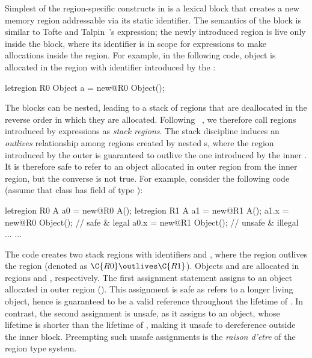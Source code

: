 Simplest of the region-specific constructs in \name is a 
lexical block that creates a new memory region addressable via its
static identifier. The semantics of the  block is similar
to Tofte and Talpin~\cite{ttpopl94}'s  expression; the
newly introduced region is live only inside the block, where its
identifier is in scope for  expressions to make allocations
inside the region. For example, in the following code, object  is
allocated in the region with identifier  introduced by the
:
\begin{center}
\begin{codejava}
  letregion R0 {
    Object a = new@R0 Object();
  }
\end{codejava}
\end{center}
The  blocks can be nested, leading to a stack of regions
that are deallocated in the reverse order in which they are allocated.
Following ~\cite{cyclonepldi02}, we therefore call regions introduced
by  expressions as \emph{stack regions}. The stack
discipline induces an \emph{outlives} relationship among regions created
by nested s, where the region introduced by the outer
 is guaranteed to outlive the one introduced by the inner
. It is therefore safe to refer to an object allocated in
outer region from the inner region, but the converse is not true. For
example, consider the following code (assume that class  has
field  of type ):
\begin{center}
\begin{codejava}
  letregion R0 {
    A a0 = new@R0 A();
    letregion R1 {
      A a1 = new@R1 A();
      a1.x = new@R0 Object(); // safe & legal
      a0.x = new@R1 Object(); // unsafe & illegal
      ...
    }
    ...
  }
\end{codejava}
\end{center}
The code creates two stack regions with identifiers  and ,
where the region  outlives the region  (denoted as $\C{R0}
\outlives \C{R1}$).  Objects  and  are allocated in regions
 and , respectively. The first assignment statement
assigns to  an object allocated in outer region (). This
assignment is safe as  refers to a longer living object, hence
is guaranteed to be a valid reference throughout the lifetime of
.  In contrast, the second assignment is unsafe, as it assigns
to  an object, whose lifetime is shorter than the lifetime of
, making it unsafe to dereference  outside the inner
block. 
Preempting such unsafe assignments is the \emph{raison d'etre} of the
region type system.

